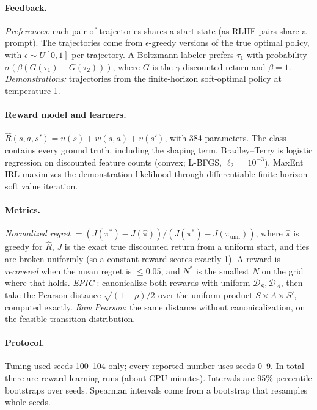 \documentclass[10pt]{article}
\begin{document}
\paragraph{Feedback.} \emph{Preferences:} each pair of trajectories shares a start state (as RLHF pairs share a prompt). The trajectories come
from $\epsilon$-greedy versions of the true optimal policy, with $\epsilon\sim U[0,1]$ per trajectory. A Boltzmann labeler prefers $\tau_1$ with probability
$\sigma(\beta(G(\tau_1)-G(\tau_2)))$, where $G$ is the $\gamma$-discounted return and $\beta=1$. \emph{Demonstrations:} trajectories from the
finite-horizon soft-optimal policy at temperature 1.

\paragraph{Reward model and learners.} $\hat R(s,a,s')=u(s)+w(s,a)+v(s')$, with 384 parameters. The class contains every ground truth,
including the shaping term. Bradley--Terry is logistic regression on discounted feature counts (convex; L-BFGS, $\ell_2=10^{-3}$).
MaxEnt IRL maximizes the demonstration likelihood through differentiable finite-horizon soft value iteration.

\paragraph{Metrics.} \emph{Normalized regret}
$=(J(\pi^*)-J(\hat\pi))/(J(\pi^*)-J(\pi_{\mathrm{unif}}))$, where $\hat\pi$ is greedy for $\hat R$, $J$ is the exact true discounted return from a
uniform start, and ties are broken uniformly (so a constant reward scores exactly 1). A reward is \emph{recovered} when the mean regret is
$\le0.05$, and $N^*$ is the smallest $N$ on the grid where that holds.
\emph{EPIC} \citep{gleave2021epic}: canonicalize both rewards with uniform $\mathcal D_S,\mathcal D_A$, then take the Pearson distance
$\sqrt{(1-\rho)/2}$ over the uniform product $S\times A\times S'$, computed exactly. \emph{Raw Pearson}: the same distance without
canonicalization, on the feasible-transition distribution.

\paragraph{Protocol.} Tuning used seeds 100--104 only; every reported number uses seeds 0--9. In total there are \nruns{} reward-learning runs
(about \cpuminutes{} CPU-minutes). Intervals are 95\% percentile bootstraps over seeds. Spearman intervals come from a bootstrap
that resamples whole seeds.
\end{document}
